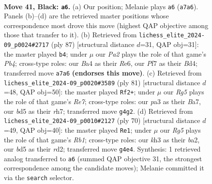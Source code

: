 \documentclass[11pt]{article}
\begin{document}
\clearpage

\begin{figure}[p]\centering
\begin{subfigure}{0.46\textwidth}\centering
\resizebox{\linewidth}{!}{%
\newchessgame
\chessboard[
  setfen={r7/pp3p2/6k1/3B3p/bP2P1r1/P6K/8/R4R2 b - - 0 41},
  showmover=false,
  pgfstyle=straightmove, color=movearrow, markmove={a7-a6}
]}
\caption{}
\end{subfigure}\hfill
\begin{subfigure}{0.46\textwidth}\centering
\resizebox{\linewidth}{!}{%
\newchessgame
\chessboard[
  setfen={8/8/3kr3/pp2p1P1/3bR3/5PK1/P2BR3/3r4 b - - 2 44},
  showmover=false,
  pgfstyle=straightmove, color=movearrow, markmove={b5-b4}
]}
\caption{}
\end{subfigure}
\\[4pt]
\begin{subfigure}{0.46\textwidth}\centering
\resizebox{\linewidth}{!}{%
\newchessgame
\chessboard[
  setfen={5k2/b4p1R/p4B2/1p2PP2/3p4/3R1K1P/P1r1r3/8 b - - 2 41},
  showmover=false,
  pgfstyle=straightmove, color=movearrow, markmove={e2-f2}
]}
\caption{}
\end{subfigure}\hfill
\begin{subfigure}{0.46\textwidth}\centering
\resizebox{\linewidth}{!}{%
\newchessgame
\chessboard[
  setfen={6k1/1R3p2/1p4p1/1P6/3P3P/2r3P1/b2r1PB1/1R4K1 w - - 2 36},
  showmover=false,
  pgfstyle=straightmove, color=movearrow, markmove={b1-e1}
]}
\caption{}
\end{subfigure}
\caption{\textbf{Move 41, Black: \texttt{a6}.} (a) Our position; Melanie plays \texttt{a6} (\texttt{a7a6}). Panels (b)--(d) are the retrieved master positions whose correspondence most drove this move (highest QAP objective among those that transfer to it). (b) Retrieved from \texttt{lichess\_elite\_2024-09\_p0024\#2717} (ply 87) [structural distance $d$=31, QAP obj=31]: the master played \texttt{b4}; under $\mu$ our \emph{Pa2} plays the role of that game's \emph{Pb4}; cross-type roles: our \emph{B}a4 as their \emph{R}e6, our \emph{P}f7 as their \emph{B}d4; transferred move \texttt{a7a6} \textbf{(endorses this move)}. (c) Retrieved from \texttt{lichess\_elite\_2024-09\_p0020\#3589} (ply 81) [structural distance $d$=48, QAP obj=50]: the master played \texttt{Rf2+}; under $\mu$ our \emph{Rg5} plays the role of that game's \emph{Re7}; cross-type roles: our \emph{p}a3 as their \emph{B}a7, our \emph{b}d5 as their \emph{r}h7; transferred move \texttt{g4g2}. (d) Retrieved from \texttt{lichess\_elite\_2024-09\_p0010\#2127} (ply 70) [structural distance $d$=49, QAP obj=40]: the master played \texttt{Re1}; under $\mu$ our \emph{Rg5} plays the role of that game's \emph{Rb1}; cross-type roles: our \emph{k}h3 as their \emph{b}a2, our \emph{b}d5 as their \emph{r}d2; transferred move \texttt{g4e4}. Synthesis: 1 retrieved analog transferred to \texttt{a6} (summed QAP objective 31, the strongest correspondence among the candidate moves); Melanie committed it via the \texttt{search} selector.}
\label{fig:thought-m81}
\end{figure}
\end{document}
